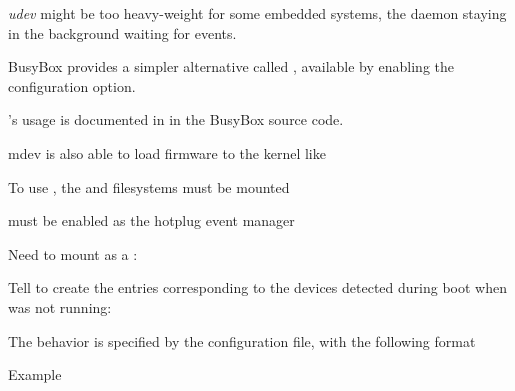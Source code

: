   \startitemize
  \item {\em udev} might be too heavy-weight for some embedded
    systems, the  daemon staying in the background waiting for
    events.
  \item BusyBox provides a simpler alternative called ,
    available by enabling the  configuration option.
  \item {}'s usage is documented in  in the BusyBox source code.
  \item{}mdev is also able to load firmware to the kernel like
  \stopitemize

  \startitemize
  \item To use , the  and  filesystems must be mounted
  \item {} must be enabled as the hotplug event manager\\
  \item Need to mount  as a :\\
  \item Tell  to create the  entries
    corresponding to the devices detected
    during boot when  was not running:\\
  \item The behavior is specified by the  configuration
    file, with the following format\\
  \item Example\\
  \stopitemize

